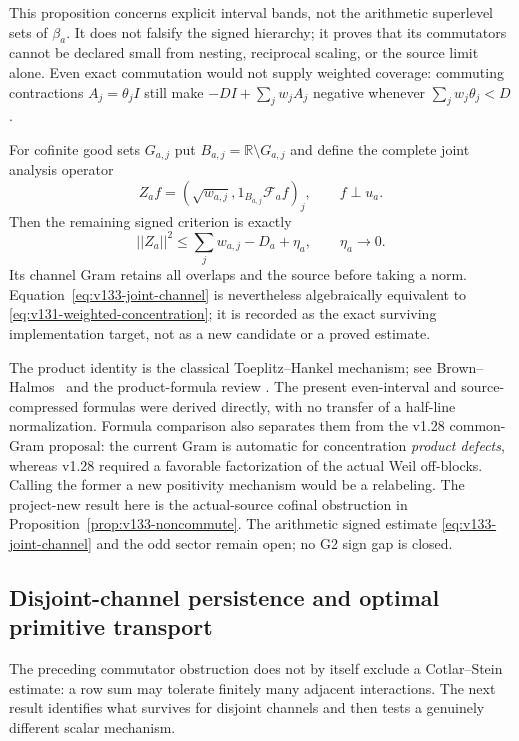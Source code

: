 \documentclass[11pt]{article}
\def\norm#1{||#1||}%
\theoremstyle{remark}
\newcommand{\norm}[1]{\left\lVert #1\right\rVert}
\begin{document}
This proposition concerns explicit interval bands, not the arithmetic
superlevel sets of $\beta_a$.  It does not falsify the signed hierarchy;
it proves that its commutators cannot be declared small from nesting,
reciprocal scaling, or the source limit alone.  Even exact commutation
would not supply weighted coverage: commuting contractions
$A_j=\theta_jI$ still make $-DI+\sum_jw_jA_j$ negative whenever
$\sum_jw_j\theta_j<D$.

For cofinite good sets $G_{a,j}$ put $B_{a,j}=\mathbb R\setminus G_{a,j}$
and define the complete joint analysis operator
\[
 Z_af=(\sqrt{w_{a,j}},1_{B_{a,j}}\mathcal F_af)_j,
 \qquad f\perp u_a.
\]
Then the remaining signed criterion is exactly
\begin{equation}
 \norm{Z_a}^2
 \le\sum_jw_{a,j}-D_a+\eta_a,
 \qquad \eta_a\longrightarrow0.\label{eq:v133-joint-channel}
\end{equation}
Its channel Gram retains all overlaps and the source before taking a
norm.  Equation~\eqref{eq:v133-joint-channel} is nevertheless
algebraically equivalent to \eqref{eq:v131-weighted-concentration}; it
is recorded as the exact surviving implementation target, not as a new
candidate or a proved estimate.

The product identity is the classical Toeplitz--Hankel mechanism; see
Brown--Halmos~\cite{BrownHalmos1964} and the product-formula review
\cite{Virtanen2022}.  The present even-interval and source-compressed
formulas were derived directly, with no transfer of a half-line
normalization.  Formula comparison also separates them from the v1.28
common-Gram proposal: the current Gram is automatic for concentration
\emph{product defects}, whereas v1.28 required a favorable factorization
of the actual Weil off-blocks.  Calling the former a new positivity
mechanism would be a relabeling.  The project-new result here is the
actual-source cofinal obstruction in
Proposition~\ref{prop:v133-noncommute}.  The arithmetic signed estimate
\eqref{eq:v133-joint-channel} and the odd sector remain open; no G2 sign
gap is closed.

\subsection{Disjoint-channel persistence and optimal primitive transport}

The preceding commutator obstruction does not by itself exclude a
Cotlar--Stein estimate: a row sum may tolerate finitely many adjacent
interactions.  The next result identifies what survives for disjoint
channels and then tests a genuinely different scalar mechanism.
\end{document}
